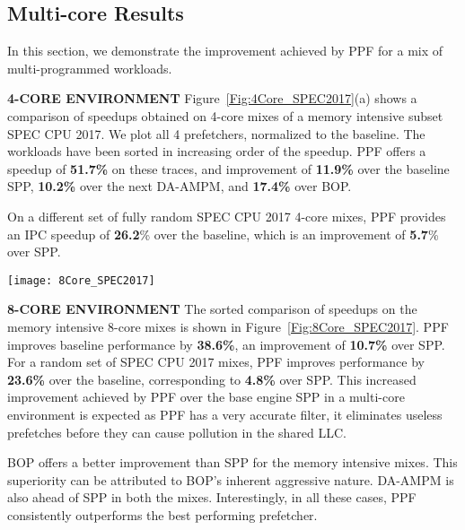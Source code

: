 \subsection{Multi-core Results}
\label{Results-Multi}
In this section, we demonstrate the improvement achieved by PPF for a mix of
multi-programmed workloads.
\newline

\noindent \textbf{4-CORE ENVIRONMENT}
\newline
Figure~\ref{Fig:4Core_SPEC2017}(a) shows a
comparison of speedups obtained on 4-core mixes of a memory intensive subset
SPEC CPU 2017.  We plot all 4 prefetchers, normalized to the baseline.  The
workloads have been sorted in increasing order of the speedup.  PPF offers a
speedup of \textbf{51.7\%} on these traces, and improvement of \textbf{11.9\%}
over the baseline SPP, \textbf{10.2\%} over the next DA-AMPM, and
\textbf{17.4\%} over BOP.

On a different set of fully random SPEC CPU 2017 4-core mixes, PPF provides an
IPC speedup of \textbf{26.2}\% over the baseline, which is an improvement of
\textbf{5.7}\% over SPP.
\newline

\begin{figure*}[ht]
\texttt{[image: 8Core\_SPEC2017]}
\caption{Normalized Speedup for 8-core SPEC CPU 2017 Workloads}
\label{Fig:8Core_SPEC2017}
\end{figure*}

\noindent \textbf{8-CORE ENVIRONMENT}
\newline
The sorted comparison of speedups on the memory
intensive 8-core mixes is shown in Figure~\ref{Fig:8Core_SPEC2017}.  PPF
improves baseline performance by \textbf{38.6\%}, an improvement of
\textbf{10.7\%} over SPP.  For a random set of SPEC CPU 2017 mixes, PPF
improves performance by \textbf{23.6\%} over the baseline, corresponding to
\textbf{4.8\%} over SPP.  This increased improvement achieved by PPF over the
base engine SPP in a multi-core environment is expected as PPF has a very
accurate filter, it eliminates useless prefetches before they can cause
pollution in the shared LLC.

BOP offers a better improvement than SPP for the memory intensive mixes. This
superiority can be attributed to BOP's inherent aggressive nature.  DA-AMPM is
also ahead of SPP in both the mixes. Interestingly, in all these cases, PPF
consistently outperforms the best performing prefetcher.


